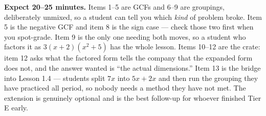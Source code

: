 \documentclass[10pt]{article}
\begin{document}
\begin{teachernote}[Homework]
    \textbf{Expect 20--25 minutes.} Items 1--5 are GCFs and 6--9 are groupings, deliberately
    unmixed, so a student can tell you which \emph{kind} of problem broke. Item 5 is the negative
    GCF and item 8 is the sign case --- check those two first when you spot-grade. Item 9 is the
    only one needing both moves, so a student who factors it as $3(x+2)\left(x^2+5\right)$ has the
    whole lesson. Items 10--12 are the crate: item 12 asks what the factored form tells the company
    that the expanded form does not, and the answer wanted is ``the actual dimensions.'' Item 13 is
    the bridge into Lesson 1.4 --- students split $7x$ into $5x+2x$ and then run the grouping they
    have practiced all period, so nobody needs a method they have not met. The extension is
    genuinely optional and is the best follow-up for whoever finished Tier E early.
\end{teachernote}
\end{document}
